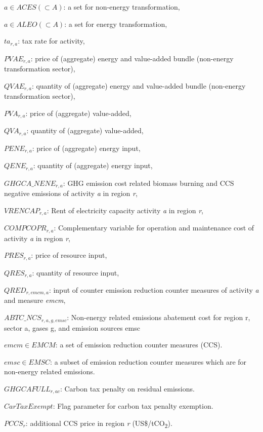 \documentclass[10pt,a4paper,titlepage,dvipdfmx]{book}
\newif\ifAIMHubReviewMode
\newenvironment{changedblock}{\begingroup\ifAIMHubReviewMode\color{red}\fi}{\endgroup}
\begin{document}
\begin{flushleft}
$a\in ACES\left(\subset A\right)$: a set for non-energy transformation,

$a\in ALEO\left(\subset A\right)$: a set for energy transformation,

$ta_{r,a}$: tax rate for activity,

$PVAE_{r,a}$: price of (aggregate) energy and value-added bundle (non-energy transformation sector),

$QVAE_{r,a}$: quantity of (aggregate) energy and value-added bundle (non-energy transformation sector),

$PVA_{r,a}$: price of (aggregate) value-added,

$QVA_{r,a}$: quantity of (aggregate) value-added,

$PENE_{r,a}$: price of (aggregate) energy input,

$QENE_{r,a}$: quantity of (aggregate) energy input,

$GHGCA\_NENE_{r,a}$: GHG emission cost related biomass burning and CCS negative emissions of activity \textit{a} in region \textit{r},

$VRENCAP_{r,a}$: Rent of electricity capacity activity \textit{a} in region \textit{r},

$COMPCOPR_{r,a}$: Complementary variable for operation and maintenance cost of activity \textit{a} in region \textit{r},

$PRES_{r,a}$: price of resource input,

$QRES_{r,a}$: quantity of resource input,

$QRED_{r,emcm,a}$: input of counter emission reduction counter measures of activity \textit{a} and measure \textit{emcm},

$ABTC\_NCS_{r,a,g,emsc}$: Non-energy related emissions abatement cost for region r, sector a, gases g, and emission sources emsc

$emcm\in EMCM$: a set of emission reduction counter measures (CCS).

$emsc\in EMSC$: a subset of emission reduction counter measures which are for non-energy related emissions.

$GHGCAFULL_{r,ac}$: Carbon tax penalty on residual emissions. 

$CarTaxExempt$: Flag parameter for carbon tax penalty exemption.

\begin{changedblock}
$PCCS_{r}$: additional CCS price in region \textit{r} (US\$/tCO\textsubscript{2}).
\end{changedblock}

\end{flushleft}
\end{document}

